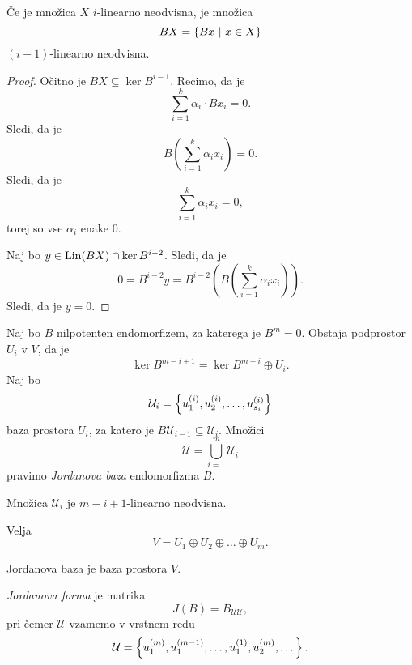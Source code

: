 \documentclass[12pt, a4paper]{article}
\begin{document}
\begin{trditev}
Če je množica $X$ $i$-linearno neodvisna, je množica
\[
BX=\left\{Bx~\middle\vert~x\in X\right\}
\]
$(i-1)$-linearno neodvisna.
\end{trditev}

\begin{proof}
Očitno je $BX\subseteq\ker B^{i-1}$. Recimo, da je
\[
\sum_{i=1}^k \alpha_i\cdot B x_i = 0.
\]
Sledi, da je
\[
B\left(\sum_{i=1}^k \alpha_ix_i\right)=0.
\]
Sledi, da je
\[
\sum_{i=1}^k \alpha_ix_i=0,
\]
torej so vse $\alpha_i$ enake $0$.

Naj bo $y\in\operatorname{Lin}(BX)\cap\ker B^{i-2}$. Sledi, da je
\[
0=B^{i-2}y=B^{i-2}\left(B\left(\sum_{i=1}^k \alpha_ix_i\right)\right).
\]
Sledi, da je $y=0$.
\end{proof}

\begin{definicija}
Naj bo $B$ nilpotenten endomorfizem, za katerega je $B^m=0$. Obstaja podprostor $U_i$ v $V$, da je
\[
\ker B^{m-i+1}=\ker B^{m-i}\oplus U_i.
\]
Naj bo
\[
\mathcal{U}_i=\left\{u_1^{(i)}, u_2^{(i)},\dots, u_{s_i}^{(i)}\right\}
\]
baza prostora $U_i$, za katero je $B\mathcal{U}_{i-1}\subseteq\mathcal{U}_i$. Množici
\[
\mathcal{U}=\bigcup_{i=1}^m\mathcal{U}_i
\]
pravimo \emph{Jordanova baza} endomorfizma $B$.
\end{definicija}

\begin{opomba}
Množica $\mathcal{U}_i$ je $m-i+1$-linearno neodvisna.
\end{opomba}

\begin{trditev}
Velja
\[
V=U_1\oplus U_2\oplus\dots\oplus U_m.
\]
\end{trditev}

\obvs

\begin{posledica}
Jordanova baza je baza prostora $V$.
\end{posledica}

\begin{okvir}
\begin{definicija}
\emph{Jordanova forma} je matrika
\[
J(B)=B_{\mathcal{UU}},
\]
pri čemer $\mathcal{U}$ vzamemo v vrstnem redu
\[
\mathcal{U}=\left\{u_1^{(m)},u_1^{(m-1)},\dots,u_1^{(1)},u_2^{(m)},\dots\right\}.
\]
\end{definicija}
\end{okvir}
\end{document}

